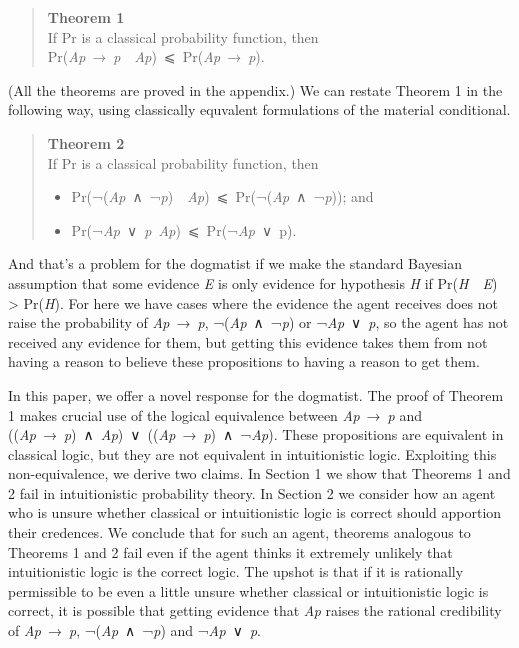 \documentclass[
  11pt,
  letterpaper,
  DIV=11,
  numbers=noendperiod,
  twoside]{scrartcl}
\providecommand{\tightlist}{%
  \setlength{\itemsep}{0pt}\setlength{\parskip}{0pt}}
\begin{document}
\begin{quote}
\textbf{Theorem 1}\\
If Pr is a classical probability function, then\\
Pr(\emph{Ap}~→~\emph{p}~\textbar~\emph{Ap})~⩽~Pr(\emph{Ap}~→~\emph{p}).
\end{quote}

(All the theorems are proved in the appendix.) We can restate Theorem 1
in the following way, using classically equvalent formulations of the
material conditional.

\begin{quote}
\textbf{Theorem 2}\\
If Pr is a classical probability function, then

\begin{itemize}
\tightlist
\item
  Pr(¬(\emph{Ap}~∧~¬\emph{p})~\textbar~\emph{Ap})~⩽~Pr(¬(\emph{Ap}~∧~¬\emph{p}));
  and
\item
  Pr(¬\emph{Ap}~∨~\emph{p}\textbar~\emph{Ap})~⩽~Pr(¬\emph{Ap}~∨~p).
\end{itemize}
\end{quote}

And that's a problem for the dogmatist if we make the standard Bayesian
assumption that some evidence \emph{E} is only evidence for hypothesis
\emph{H} if Pr(\emph{H}~\textbar~\emph{E}) \textgreater{} Pr(\emph{H}).
For here we have cases where the evidence the agent receives does not
raise the probability of \emph{Ap}~→~\emph{p}, ¬(\emph{Ap}~∧~¬\emph{p})
or ¬\emph{Ap}~∨~\emph{p}, so the agent has not received any evidence for
them, but getting this evidence takes them from not having a reason to
believe these propositions to having a reason to get them.

In this paper, we offer a novel response for the dogmatist. The proof of
Theorem 1 makes crucial use of the logical equivalence between
\emph{Ap}~→~\emph{p} and
((\emph{Ap}~→~\emph{p})~∧~\emph{Ap})~∨~((\emph{Ap}~→~\emph{p})~∧~¬\emph{Ap}).
These propositions are equivalent in classical logic, but they are not
equivalent in intuitionistic logic. Exploiting this non-equivalence, we
derive two claims. In Section 1 we show that Theorems 1 and 2 fail in
intuitionistic probability theory. In Section 2 we consider how an agent
who is unsure whether classical or intuitionistic logic is correct
should apportion their credences. We conclude that for such an agent,
theorems analogous to Theorems 1 and 2 fail even if the agent thinks it
extremely unlikely that intuitionistic logic is the correct logic. The
upshot is that if it is rationally permissible to be even a little
unsure whether classical or intuitionistic logic is correct, it is
possible that getting evidence that \emph{Ap} raises the rational
credibility of \emph{Ap}~→~\emph{p}, ¬(\emph{Ap}~∧~¬\emph{p}) and
¬\emph{Ap}~∨~\emph{p}.
\end{document}

